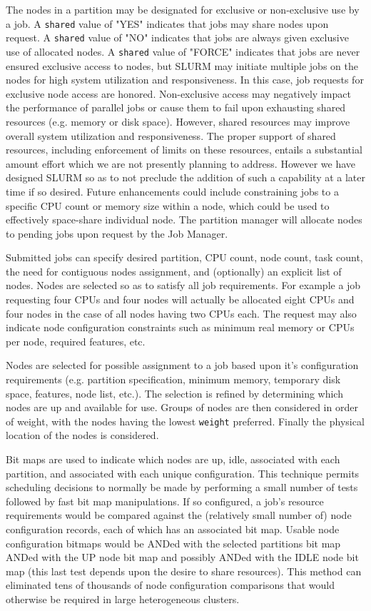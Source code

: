 The nodes in a partition may be designated for exclusive or non-exclusive
use by a job.  A {\tt shared} value of "YES" indicates that jobs may share nodes
upon request.  A {\tt shared} value of "NO" indicates that jobs are always given
exclusive use of allocated nodes.  A {\tt shared} value of "FORCE" indicates
that jobs are never ensured exclusive access to nodes, but SLURM
may initiate multiple jobs on the nodes for high system utilization
and responsiveness.  In this case, job requests for exclusive node
access are honored.  Non-exclusive access may negatively impact
the performance of parallel jobs or cause them to fail upon exhausting
shared resources (e.g. memory or disk space). However, shared resources
may improve overall system utilization and responsiveness. The
proper support of shared resources, including enforcement of limits on
these resources, entails a substantial amount effort which we are not
presently planning to address.  However we have designed SLURM so as
to not preclude the addition of such a capability at a later time if
so desired.  Future enhancements could include constraining jobs to a
specific CPU count or memory size within a node, which could be used
to effectively space-share individual node.  The partition manager will 
allocate nodes to pending jobs upon request by the Job Manager.

Submitted jobs can specify desired partition, CPU count, node count,
task count,  the need for contiguous nodes assignment, and (optionally)
an explicit list of nodes.  Nodes are selected so as to satisfy all
job requirements.  For example a job requesting four CPUs and four nodes
will actually be allocated eight CPUs and four nodes in the case of all
nodes having two CPUs each.  
The request may also indicate node configuration constraints such as
minimum real memory or CPUs per node, required features, etc.

Nodes are selected for possible assignment to a job based upon it's
configuration requirements (e.g. partition specification, minimum memory,
temporary disk space, features, node list, etc.).  The selection is
refined by determining which nodes are up and available for use.
Groups of nodes are then considered in order of weight, with the
nodes having the lowest {\tt weight} preferred.
Finally the physical location of the nodes is considered.

Bit maps are used to indicate which nodes are up, idle, associated
with each partition, and associated with each unique configuration.
This technique permits scheduling decisions to normally be made by
performing a small number of tests followed by fast bit map manipulations. 
If so configured, a job's resource requirements would be compared 
against the (relatively small number of) node configuration records, each of 
which has an associated bit map. Usable node configuration bitmaps 
would be ANDed with the selected partitions bit map ANDed with the 
UP node bit map and possibly ANDed with the IDLE node bit map (this
last test depends upon the desire to share resources). 
This method can eliminated tens of thousands of node configuration 
comparisons that would otherwise be required in large heterogeneous 
clusters.

